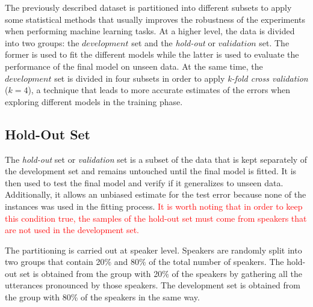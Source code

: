 
The previously described dataset is partitioned into different subsets
to apply some statistical methods that usually
improves the robustness of the experiments
when performing machine learning tasks.
At a higher level,
the data is divided into two groups: the $development$ set and the \textit{hold-out} or $validation$ set. The former is used to fit the different models while the latter is used
to evaluate the performance
of the final model on unseen data. At the same time, the $development$ set is divided in four
subsets in order to apply \textit{k-fold cross validation} ($k=4$), a
technique that leads to more accurate estimates of the errors when exploring different
models in the training phase.

\subsection{Hold-Out Set}

The \textit{hold-out} set or \textit{validation} set is a subset of the data that is kept
separately of the development set and remains untouched until the final model is fitted. It is
then used to test the final model and verify if it generalizes to unseen data.
Additionally, it allows
an unbiased estimate for the test error because none of the instances was used in the
fitting process.
\textcolor{red}{
  It is worth noting that in order to keep this condition true, the samples
  of the hold-out set must come from speakers that are not used in the development set.
}

The partitioning is carried out at speaker level. Speakers are randomly split into two groups
that contain 20\% and 80\% of the total number of speakers. The hold-out set
is obtained from the group with 20\% of the speakers by gathering all the utterances pronounced
by those speakers. The development set is obtained from the
group with 80\% of the speakers in the same way.
